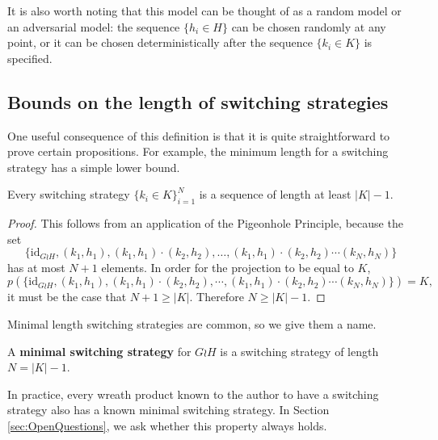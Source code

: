 It is also worth noting that this model can be thought of as a random model or an
adversarial model: the sequence $\{h_i \in H\}$ can be chosen
randomly at any point, or it can be chosen deterministically
after the sequence $\{k_i \in K\}$ is specified.

\subsection{Bounds on the length of switching strategies}

One useful consequence of this definition is that it is quite straightforward to
prove certain propositions. For example, the minimum length for a switching strategy
has a simple lower bound.
\begin{proposition}
  Every switching strategy $\{k_i \in K\}_{i=1}^{N}$ is a sequence of
  length at least ${|K| - 1}$.
\end{proposition}
\begin{proof}
  This follows from an application of the Pigeonhole Principle, because the set
  \begin{equation}
    \{\mathrm{id}_{G \wr H}, (k_1, h_1), (k_1, h_1)\cdot(k_2, h_2), \ldots, (k_1, h_1)\cdot(k_2, h_2)\cdots(k_N, h_N)\}
  \end{equation}
  has at most $N+1$ elements. In order for the projection to be equal to $K$,
  \begin{equation}
    p(\{\mathrm{id}_{G \wr H}, (k_1, h_1), (k_1, h_1)\cdot(k_2, h_2), \cdots, (k_1, h_1)\cdot(k_2, h_2)\cdots(k_N, h_N)\}) = K,
  \end{equation} it must be the case that $N+1 \geq |K|$.
  Therefore $N \geq |K| - 1$.
\end{proof}

Minimal length switching strategies are common, so we give them a name.
\begin{definition}
  A \textbf{minimal switching strategy} for $G \wr H$ is a switching strategy
  of length $N = |K| - 1.$
\end{definition}

In practice, every wreath product known to the author to have a switching
strategy also has a known minimal switching strategy.
In Section \ref{sec:OpenQuestions}, we ask whether this property always holds.


